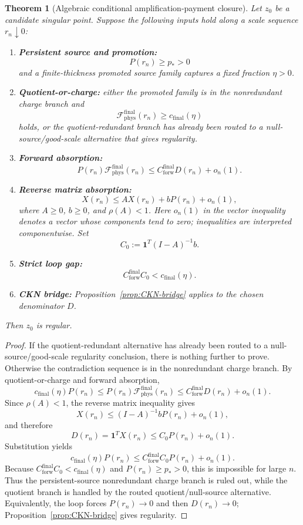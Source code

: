 \documentclass[11pt]{article}
\newtheorem{theorem}{Theorem}
\begin{document}
\begin{theorem}[Algebraic conditional amplification-payment closure]
\label{thm:conditional-closure}
Let \(z_0\) be a candidate singular point.  Suppose the following inputs hold
along a scale sequence \(r_n\downarrow0\):
\begin{enumerate}
\item \textbf{Persistent source and promotion:}
\[
P(r_n)\ge p_*>0
\]
and a finite-thickness promoted source family captures a fixed fraction
\(\eta>0\).
\item \textbf{Quotient-or-charge:} either the promoted family is in the
nonredundant charge branch and
\[
\mathcal F_{\mathrm{phys}}^{\mathrm{final}}(r_n)
\ge c_{\mathrm{final}}(\eta)
\]
holds, or the quotient-redundant branch has already been routed to a
null-source/good-scale alternative that gives regularity.
\item \textbf{Forward absorption:}
\[
P(r_n)\mathcal F_{\mathrm{phys}}^{\mathrm{final}}(r_n)
\le
C_{\mathrm{forw}}^{\mathrm{final}}D(r_n)+o_n(1).
\]
\item \textbf{Reverse matrix absorption:}
\[
X(r_n)\le AX(r_n)+bP(r_n)+o_n(1),
\]
where \(A\ge0\), \(b\ge0\), and \(\rho(A)<1\).  Here \(o_n(1)\) in the vector
inequality denotes a vector whose components tend to zero; inequalities are
interpreted componentwise.  Set
\[
C_0:=\mathbf 1^T(I-A)^{-1}b.
\]
\item \textbf{Strict loop gap:}
\[
C_{\mathrm{forw}}^{\mathrm{final}}C_0
<
c_{\mathrm{final}}(\eta).
\]
\item \textbf{CKN bridge:} Proposition~\ref{prop:CKN-bridge} applies to the
chosen denominator \(D\).
\end{enumerate}
Then \(z_0\) is regular.
\end{theorem}

\begin{proof}
If the quotient-redundant alternative has already been routed to a
null-source/good-scale regularity conclusion, there is nothing further to
prove.  Otherwise the contradiction sequence is in the nonredundant charge
branch.  By
quotient-or-charge and forward absorption,
\[
c_{\mathrm{final}}(\eta)P(r_n)
\le
P(r_n)\mathcal F_{\mathrm{phys}}^{\mathrm{final}}(r_n)
\le
C_{\mathrm{forw}}^{\mathrm{final}}D(r_n)+o_n(1).
\]
Since \(\rho(A)<1\), the reverse matrix inequality gives
\[
X(r_n)\le (I-A)^{-1}bP(r_n)+o_n(1),
\]
and therefore
\[
D(r_n)=\mathbf 1^TX(r_n)
\le
C_0P(r_n)+o_n(1).
\]
Substitution yields
\[
c_{\mathrm{final}}(\eta)P(r_n)
\le
C_{\mathrm{forw}}^{\mathrm{final}}C_0P(r_n)+o_n(1).
\]
Because \(C_{\mathrm{forw}}^{\mathrm{final}}C_0<c_{\mathrm{final}}(\eta)\)
and \(P(r_n)\ge p_*>0\), this is impossible for large \(n\).  Thus the
persistent-source nonredundant charge branch is ruled out, while the quotient
branch is handled by the routed quotient/null-source alternative.  Equivalently,
the loop forces \(P(r_n)\to0\) and then \(D(r_n)\to0\);
Proposition~\ref{prop:CKN-bridge} gives regularity.
\end{proof}
\end{document}
